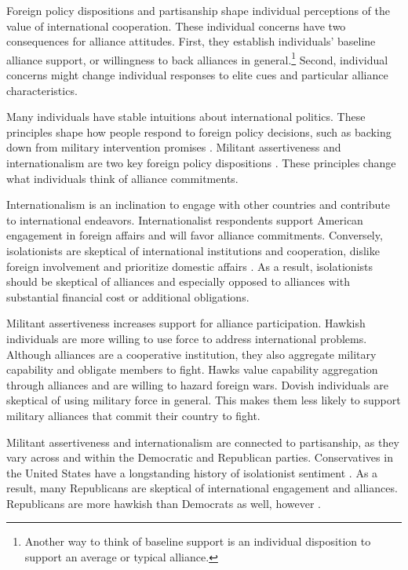 \documentclass[12pt]{article}
\begin{document}
Foreign policy dispositions and partisanship shape individual perceptions of the value of international cooperation. 
These individual concerns have two consequences for alliance attitudes. 
First, they establish individuals' baseline alliance support, or willingness to back alliances in general.\footnote{Another way to think of baseline support is an individual disposition to support an average or typical alliance.} 
Second, individual concerns might change individual responses to elite cues and particular alliance characteristics. 


Many individuals have stable intuitions about international politics. 
These principles shape how people respond to foreign policy decisions, such as backing down from military intervention promises \citep{KertzerBrutger2016}. 
Militant assertiveness and internationalism are two key foreign policy dispositions \citep{Herrmannetal1999}.  
These principles change what individuals think of alliance commitments. 


Internationalism is an inclination to engage with other countries and contribute to international endeavors. 
Internationalist respondents support American engagement in foreign affairs and will favor alliance commitments. 
Conversely, isolationists are skeptical of international institutions and cooperation, dislike foreign involvement and prioritize domestic affairs \citep{Kertzer2013}. 
As a result, isolationists should be skeptical of alliances and especially opposed to alliances with substantial financial cost or additional obligations. 


Militant assertiveness increases support for alliance participation. 
Hawkish individuals are more willing to use force to address international problems. 
Although alliances are a cooperative institution, they also aggregate military capability \citep{FordhamPoast2014} and obligate members to fight.
Hawks value capability aggregation through alliances and are willing to hazard foreign wars.  
Dovish individuals are skeptical of using military force in general.
This makes them less likely to support military alliances that commit their country to fight.  


Militant assertiveness and internationalism are connected to partisanship, as they vary across and within the Democratic and Republican parties. 
Conservatives in the United States have a longstanding history of isolationist sentiment \citep{Kupchan2020}.
As a result, many Republicans are skeptical of international engagement and alliances. 
Republicans are more hawkish than Democrats as well, however \citep{Gries2014}. 
\end{document}
